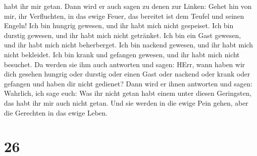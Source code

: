 habt ihr mir getan.  Dann wird er auch sagen zu denen zur
Linken: Gehet hin von mir, ihr Verfluchten, in das ewige Feuer, das
bereitet ist dem Teufel und seinen Engeln!  Ich bin hungrig
gewesen, und ihr habt mich nicht gespeiset. Ich bin durstig gewesen, und
ihr habt mich nicht getränket.  Ich bin ein Gast gewesen,
und ihr habt mich nicht beherberget. Ich bin nackend gewesen, und ihr
habt mich nicht bekleidet. Ich bin krank und gefangen gewesen, und ihr
habt mich nicht besuchet.  Da werden sie ihm auch antworten
und sagen: HErr, wann haben wir dich gesehen hungrig oder durstig oder
einen Gast oder nackend oder krank oder gefangen und haben dir nicht
gedienet?  Dann wird er ihnen antworten und sagen:
Wahrlich, ich sage euch: Was ihr nicht getan habt einem unter diesen
Geringsten, das habt ihr mir auch nicht getan.  Und sie
werden in die ewige Pein gehen, aber die Gerechten in das ewige Leben.

\hypertarget{section-25}{%
\section{26}\label{section-25}}

